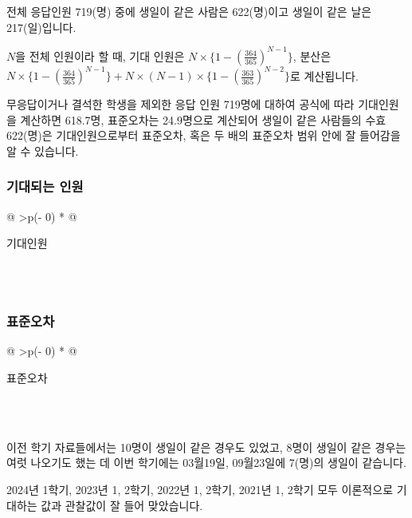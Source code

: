 \documentclass[
]{book}
\begin{document}
전체 응답인원 719(명) 중에 생일이 같은 사람은 622(명)이고 생일이 같은 날은 217(일)입니다.

\(N\)을 전체 인원이라 할 때, 기대 인원은 \(N\times\{1- (\frac{364}{365})^{N-1}\}\),
분산은 \(N\times\{1- (\frac{364}{365})^{N-1}\} + N\times(N-1)\times\{1-(\frac{363}{365})^{N-2}\}\)로 계산됩니다.

무응답이거나 결석한 학생을 제외한 응답 인원 719명에 대하여 공식에 따라 기대인원을 계산하면 618.7명, 표준오차는 24.9명으로 계산되어 생일이 같은 사람들의 수효 622(명)은 기대인원으로부터 표준오차, 혹은 두 배의 표준오차 범위 안에 잘 들어감을 알 수 있습니다.

\subsubsection{기대되는 인원}\label{uxae30uxb300uxb418uxb294-uxc778uxc6d0}

\begin{longtable}[]{@{}
  >{\centering\arraybackslash}p{(\columnwidth - 0\tabcolsep) * }@{}}
\toprule\noalign{}
\begin{minipage}[b]{\linewidth}\centering
기대인원
\end{minipage} \\
\midrule\noalign{}
\endhead
\bottomrule\noalign{}
 \\
\end{longtable}

\subsubsection{표준오차}\label{uxd45cuxc900uxc624uxcc28}

\begin{longtable}[]{@{}
  >{\centering\arraybackslash}p{(\columnwidth - 0\tabcolsep) * }@{}}
\toprule\noalign{}
\begin{minipage}[b]{\linewidth}\centering
표준오차
\end{minipage} \\
\midrule\noalign{}
\endhead
\bottomrule\noalign{}
 \\
\end{longtable}

이전 학기 자료들에서는 10명이 생일이 같은 경우도 있었고, 8명이 생일이 같은 경우는 여럿 나오기도 했는 데 이번 학기에는 03월19일, 09월23일에 7(명)의 생일이 같습니다.

2024년 1학기, 2023년 1, 2학기, 2022년 1, 2학기, 2021년 1, 2학기 모두 이론적으로 기대하는 값과 관찰값이 잘 들어 맞았습니다.
\end{document}
